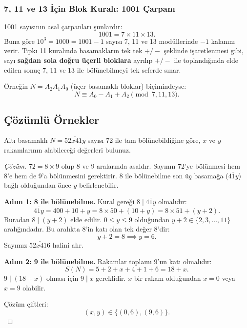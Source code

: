 \begin{figure}[h!]
\centering
{}
\end{figure}

\subsubsection{7, 11 ve 13 İçin Blok Kuralı: 1001 Çarpanı}
1001 sayısının asal çarpanları şunlardır:
\[
1001 = 7 \times 11 \times 13.
\]
Buna göre $10^3 = 1000 = 1001 - 1$ sayısı 7, 11 ve 13 modüllerinde $-1$ kalanını verir. Tıpkı 11 kuralında basamakların tek tek $+ / -$ şeklinde işaretlenmesi gibi, sayı \textbf{sağdan sola doğru üçerli bloklara} ayrılıp $+ / -$ ile toplandığında elde edilen sonuç 7, 11 ve 13 ile bölünebilmeyi tek seferde sınar.

Örneğin $N = \overline{A_2 A_1 A_0}$ (üçer basamaklı bloklar) biçimindeyse:
\[
N \equiv A_0 - A_1 + A_2 \pmod{7, 11, 13}.
\]

\subsection{Çözümlü Örnekler}

\begin{example}
Altı basamaklı $N = \overline{52x41y}$ sayısı 72 ile tam bölünebildiğine göre, $x$ ve $y$ rakamlarının alabileceği değerleri bulunuz.
\end{example}

\begin{proof}[Çözüm]
$72 = 8 \times 9$ olup 8 ve 9 aralarında asaldır. Sayının 72'ye bölünmesi hem 8'e hem de 9'a bölünmesini gerektirir. 8 ile bölünebilme son üç basamağa ($\overline{41y}$) bağlı olduğundan önce $y$ belirlenebilir.

\textbf{Adım 1: 8 ile bölünebilme.}
Kural gereği $8 \mid \overline{41y}$ olmalıdır:
\[
\overline{41y} = 400 + 10 + y = 8 \times 50 + (10 + y) = 8 \times 51 + (y + 2).
\]
Buradan $8 \mid (y + 2)$ elde edilir. $0 \le y \le 9$ olduğundan $y + 2 \in \{2, 3, \dots, 11\}$ aralığındadır. Bu aralıkta 8'in katı olan tek değer 8'dir:
\[
y + 2 = 8 \implies y = 6.
\]
Sayımız $\overline{52x416}$ halini alır.

\textbf{Adım 2: 9 ile bölünebilme.}
Rakamlar toplamı 9'un katı olmalıdır:
\[
S(N) = 5 + 2 + x + 4 + 1 + 6 = 18 + x.
\]
$9 \mid (18 + x)$ olması için $9 \mid x$ gereklidir. $x$ bir rakam olduğundan $x = 0$ veya $x = 9$ olabilir.

Çözüm çiftleri:
\[
(x, y) \in \{(0, 6), (9, 6)\}.
\]
\end{proof}

